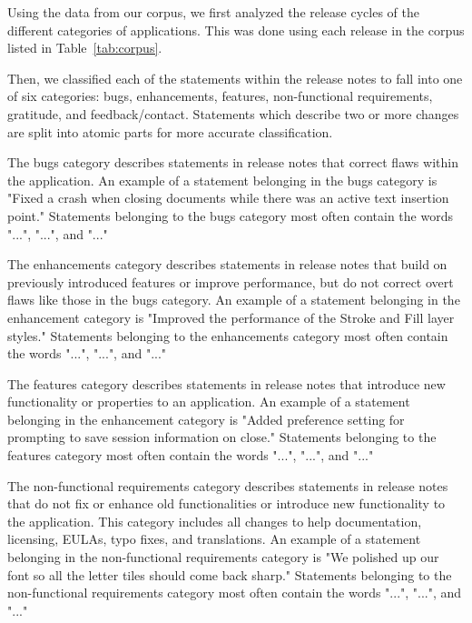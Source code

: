 \documentclass{acm_proc_article-sp}
\begin{document}
Using the data from our corpus, we first analyzed the release cycles of the different categories of applications. This was done using each release in the corpus listed in Table~\ref{tab:corpus}. 


Then, we classified each of the statements within the release notes to fall into one of six categories: bugs, enhancements, features, non-functional requirements, gratitude, and feedback/contact.
Statements which describe two or more changes are split into atomic parts for more accurate classification.

The bugs category describes statements in release notes that correct flaws within the application.
An example of a statement belonging in the bugs category is "Fixed a crash when closing documents while there was an active text insertion point."
Statements belonging to the bugs category most often contain the words "...", "...", and "..."

The enhancements category describes statements in release notes that build on previously introduced features or improve performance, but do not correct overt flaws like those in the bugs category. 
An example of a statement belonging in the enhancement category is "Improved the performance of the Stroke and Fill layer styles."
Statements belonging to the enhancements category most often contain the words "...", "...", and "..." 

The features category describes statements in release notes that  introduce new functionality or properties to an application.
An example of a statement belonging in the enhancement category is "Added preference setting for prompting to save session information on close."
Statements belonging to the features category most often contain the words "...", "...", and "..." 

The non-functional requirements category describes statements in release notes that do not fix or enhance old functionalities or introduce new functionality to the application.
This category includes all changes to help documentation, licensing, EULAs, typo fixes, and translations.
An example of a statement belonging in the non-functional requirements category is "We polished up our font so all the letter tiles should come back sharp."
Statements belonging to the non-functional requirements category most often contain the words "...", "...", and "..." 
\end{document}
